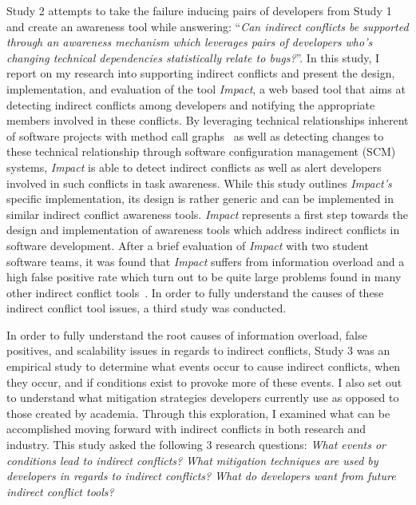 Study 2 attempts to take the failure inducing pairs of developers from Study 1 and create an awareness tool while
answering: ``\textit{Can indirect conflicts be supported through an awareness mechanism which leverages pairs of
developers who's changing technical dependencies statistically relate to bugs?}''.
In this study, I report on my research into supporting indirect conflicts and present the design, implementation, and 
evaluation of the tool \textit{Impact}, a web based tool that aims at detecting indirect conflicts among developers and 
notifying the appropriate members involved in these conflicts. By leveraging technical relationships inherent of software 
projects with method call graphs~\cite{Lakhotia:1993:CCM} as well as detecting changes to these technical relationship 
through software configuration management (SCM) systems, \textit{Impact} is able to detect indirect conflicts as well as 
alert developers involved in such conflicts in task awareness. While this study outlines \textit{Impact's} specific 
implementation, its design is rather generic and can be implemented in similar indirect conflict awareness tools. 
\textit{Impact} represents a first step towards the design and implementation of awareness tools which address indirect 
conflicts in software development. After a brief evaluation of \textit{Impact} with two student software teams, it was
found that \textit{Impact} suffers from information overload and a high false positive rate which turn out to be quite
large problems found in many other indirect conflict
tools~\cite{Sarma:2007:TSA, Holmes:2010:CAR, Trainer:2005:BGT, Servant:2010:CPI, Borici:2012:CHA}. In order to fully understand 
the causes of these indirect conflict tool issues, a third study was conducted.


In order to fully understand the root causes of information overload, false positives, and
scalability issues in regards to indirect conflicts, Study 3 was an empirical study to determine what events occur to
cause indirect conflicts, when they occur, and if conditions exist to provoke more of these events. 
I also set out to understand what mitigation strategies developers currently use as opposed to those created
by academia. Through this exploration, I examined what can be accomplished moving forward with indirect conflicts
in both research and industry. This study asked the following 3 research questions: 
\textit{What events or conditions lead to indirect conflicts?}
\textit{What mitigation techniques are used by developers in regards to indirect conflicts?}
\textit{What do developers want from future indirect conflict tools?}


